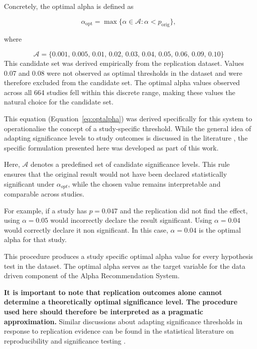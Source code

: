 {Concretely, the optimal alpha is defined as

\begin{equation}
	\alpha_{\text{opt}} = \max \{ \alpha \in \mathcal{A} : \alpha < p_{\text{orig}} \},
	\label{eq:optalpha}
\end{equation}

where 

\[
\mathcal{A} = \{0.001,\,0.005,\,0.01,\,0.02,\,0.03,\,0.04,\,0.05,\,0.06,\,0.09,\,0.10\}
\]
This candidate set was derived empirically from the replication 
dataset. Values 0.07 and 0.08 were not observed as optimal thresholds in the dataset and were therefore excluded from the candidate set. The optimal alpha values observed across all 664 studies fell within this discrete range, making these values the natural choice for the candidate set.

This equation (Equation~\ref{eq:optalpha}) was derived specifically for this system to operationalise the concept of a study-specific threshold. While the general idea of 
adapting significance levels to study outcomes is discussed in the 
literature \cite{Benjamin2018}\cite{WassersteinLazar2016}, the 
specific formulation presented here was developed as part of this work.

Here, $\mathcal{A}$ denotes a predefined set of candidate significance levels. This rule ensures that the original result would not have been declared statistically significant under $\alpha_{opt}$, while the chosen value remains interpretable and comparable across studies.

For example, if a study has $p = 0.047$ and the replication did not find the effect, using $\alpha = 0.05$ would incorrectly declare the result significant. Using $\alpha = 0.04$ would correctly declare it non significant. In this case, $\alpha = 0.04$ is the optimal alpha for that study.

This procedure produces a study specific optimal alpha value for every hypothesis test in the dataset. The optimal alpha serves as the target variable for the data driven component of the Alpha Recommendation System.

\textbf{It is important to note that replication outcomes alone cannot determine a theoretically optimal significance level. The procedure used here should therefore be interpreted as a pragmatic approximation.} Similar discussions about adapting significance thresholds in response to replication evidence can be found in the statistical literature on reproducibility and significance testing \cite{Benjamin2018, WassersteinLazar2016, OpenScience2015}.

}
